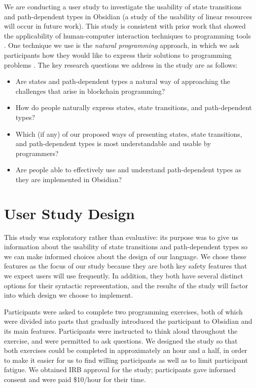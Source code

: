 \documentclass[sigplan,10pt,review]{acmart}\settopmatter{printfolios=true}
\begin{document}
We are conducting a user study to investigate the usability of state transitions and path-dependent types in 
Obsidian (a study of the usability of linear resources will occur in future work). This study is consistent with 
prior work that showed the applicability of human-computer interaction techniques to programming tools 
\cite{Myers}. One technique we use is the \textit{natural programming} approach, in which we ask participants 
how they would like to express their solutions to programming problems \cite{Natural}. The key research 
questions we address in the study are as follows: 
\begin{itemize}
\item Are states and path-dependent types a natural way of 
	approaching the challenges that arise in blockchain programming?
\item How do people naturally express states, state transitions, and path-dependent types?
\item Which (if any) of our proposed ways of presenting states, state transitions, and path-dependent types
	is most understandable and usable by programmers?
\item Are people able to effectively use and understand path-dependent types as they
are implemented in Obsidian?
\end{itemize}

\section{User Study Design}
	
This study was exploratory rather than evaluative: its purpose was to give us information about the usability of state transitions and path-dependent types so we can make informed choices about the design of our language. 
We chose these features as the focus of our study because they are both key safety features 
that we expect users will use frequently. In addition, they both have several distinct options for their syntactic representation, and the results of the study will factor into which design we choose to implement.  

Participants were asked to complete two programming exercises, both of which were divided into parts that 
gradually introduced the participant to Obsidian and its main features. 
Participants were instructed to think aloud throughout the exercise, and were permitted to ask questions. We designed the study so that both exercises could be completed in approximately an hour and a half, in order to make it easier for us to find willing participants as well as to limit participant fatigue. We obtained IRB approval for the study; participants gave informed consent and were paid \$10/hour for their time.
\end{document}
